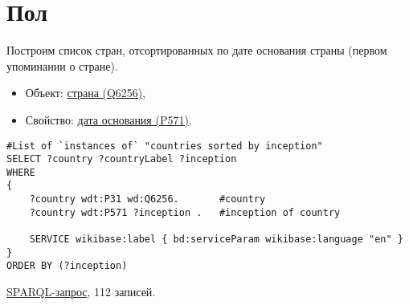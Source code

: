 \section{Пол}

Построим список стран, отсортированных по дате основания страны (первом упоминании о стране).

\begin{itemize}
    \item Объект: \href{https://www.wikidata.org/wiki/Q6256}{страна (Q6256)},
    \item Свойство: \href{https://www.wikidata.org/wiki/Property:P571}{дата основания (P571)}.
\end{itemize}

\begin{lstlisting}[language=SPARQL]
#List of `instances of` "countries sorted by inception" 
SELECT ?country ?countryLabel ?inception
WHERE
{
    ?country wdt:P31 wd:Q6256.       #country
    ?country wdt:P571 ?inception .   #inception of country
    
    SERVICE wikibase:label { bd:serviceParam wikibase:language "en" }
}
ORDER BY (?inception)
\end{lstlisting}


\href{https://query.wikidata.org/#%23List%20of%20%60instances%20of%60%20%22countries%20sorted%20by%20inception%22%20%0ASELECT%20%3Fcountry%20%3FcountryLabel%20%3Finception%0AWHERE%0A%7B%0A%20%20%20%20%3Fcountry%20wdt%3AP31%20wd%3AQ6256.%0A%20%20%20%20%3Fcountry%20wdt%3AP571%20%3Finception%20.%0A%20%20%20%20%0A%20%20%20%20SERVICE%20wikibase%3Alabel%20%7B%20bd%3AserviceParam%20wikibase%3Alanguage%20%22en%22%20%7D%0A%7D%0A%0AORDER%20BY%20%28%3Finception%29}{SPARQL-запрос}, 112 записей.